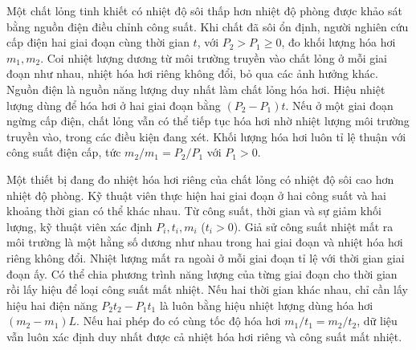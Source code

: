 \begin{ex}
Một chất lỏng tinh khiết có nhiệt độ sôi thấp hơn nhiệt độ phòng được khảo sát bằng nguồn điện điều chỉnh công suất. Khi chất đã sôi ổn định, người nghiên cứu cấp điện hai giai đoạn cùng thời gian $t$, với $P_2>P_1\ge0$, đo khối lượng hóa hơi $m_1,m_2$. Coi nhiệt lượng dương từ môi trường truyền vào chất lỏng ở mỗi giai đoạn như nhau, nhiệt hóa hơi riêng không đổi, bỏ qua các ảnh hưởng khác.
\choiceTF
{Nguồn điện là nguồn năng lượng duy nhất làm chất lỏng hóa hơi.}
{\True Hiệu nhiệt lượng dùng để hóa hơi ở hai giai đoạn bằng $(P_2-P_1)t$.}
{\True Nếu ở một giai đoạn ngừng cấp điện, chất lỏng vẫn có thể tiếp tục hóa hơi nhờ nhiệt lượng môi trường truyền vào, trong các điều kiện đang xét.}
{Khối lượng hóa hơi luôn tỉ lệ thuận với công suất điện cấp, tức $m_2/m_1=P_2/P_1$ với $P_1>0$.}
\end{ex}

\begin{ex}
Một thiết bị đang đo nhiệt hóa hơi riêng của chất lỏng có nhiệt độ sôi cao hơn nhiệt độ phòng. Kỹ thuật viên thực hiện hai giai đoạn ở hai công suất và hai khoảng thời gian có thể khác nhau. Từ công suất, thời gian và sự giảm khối lượng, kỹ thuật viên xác định $P_i,t_i,m_i$ ($t_i>0$). Giả sử công suất nhiệt mất ra môi trường là một hằng số dương như nhau trong hai giai đoạn và nhiệt hóa hơi riêng không đổi.
\choiceTF
{\True Nhiệt lượng mất ra ngoài ở mỗi giai đoạn tỉ lệ với thời gian giai đoạn ấy.}
{\True Có thể chia phương trình năng lượng của từng giai đoạn cho thời gian rồi lấy hiệu để loại công suất mất nhiệt.}
{Nếu hai thời gian khác nhau, chỉ cần lấy hiệu hai điện năng $P_2t_2-P_1t_1$ là luôn bằng hiệu nhiệt lượng dùng hóa hơi $(m_2-m_1)L$.}
{Nếu hai phép đo có cùng tốc độ hóa hơi $m_1/t_1=m_2/t_2$, dữ liệu vẫn luôn xác định duy nhất được cả nhiệt hóa hơi riêng và công suất mất nhiệt.}
\end{ex}

